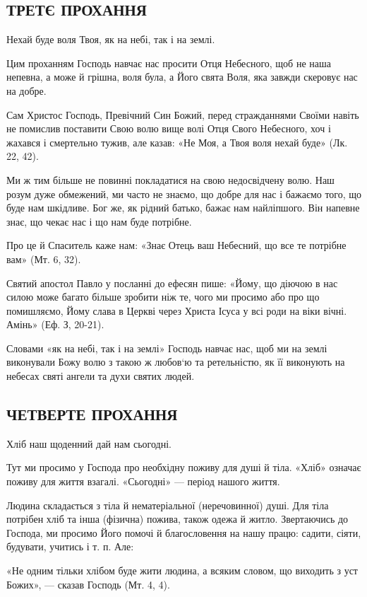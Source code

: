 \documentclass[main.tex]{subfiles}
\begin{document}
\subsection{ТРЕТЄ ПРОХАННЯ}

Нехай буде воля Твоя, як на небі, так і на землі.

Цим проханням Господь навчає нас просити Отця Небесного, щоб не наша непевна, а може й грішна, воля була, а Його свята Воля, яка завжди скеровує нас на добре.

Сам Христос Господь, Превічний Син Божий, перед стражданнями Своїми навіть не помислив поставити Свою волю вище волі Отця Свого Небесного, хоч і жахався і смертельно тужив, але казав: «Не Моя, а Твоя воля нехай буде» (Лк. 22, 42).

Ми ж тим більше не повинні покладатися на свою недосвідчену волю. Наш розум дуже обмежений, ми часто не знаємо, що добре для нас і бажаємо того, що буде нам шкідливе. Бог же, як рідний батько, бажає нам найліпшого. Він напевне знає, що чекає нас і що нам буде потрібне.

Про це й Спаситель каже нам: «Знає Отець ваш Небесний, що все те потрібне вам» (Мт. 6, 32).

Святий апостол Павло у посланні до ефесян пише: «Йому, що діючою в нас силою може багато більше зробити ніж те, чого ми просимо або про що помишляємо, Йому слава в Церкві через Христа Ісуса у всі роди на віки вічні. Амінь» (Еф. З, 20-21).

Словами «як на небі, так і на землі» Господь навчає нас, щоб ми на землі виконували Божу волю з такою ж любов`ю та ретельністю, як її виконують на небесах святі ангели та духи святих людей.

\subsection{ЧЕТВЕРТЕ ПРОХАННЯ}

Хліб наш щоденний дай нам сьогодні.

Тут ми просимо у Господа про необхідну поживу для душі й тіла. «Хліб» означає поживу для життя взагалі. «Сьогодні» — період нашого життя.

Людина складається з тіла й нематеріальної (неречовинної) душі. Для тіла потрібен хліб та інша (фізична) пожива, також одежа й житло. Звертаючись до Господа, ми просимо Його помочі й благословення на нашу працю: садити, сіяти, будувати, учитись і т. п. Але:

«Не одним тільки хлібом буде жити людина, а всяким словом, що виходить з уст Божих», — сказав Господь (Мт. 4, 4).
\end{document}
